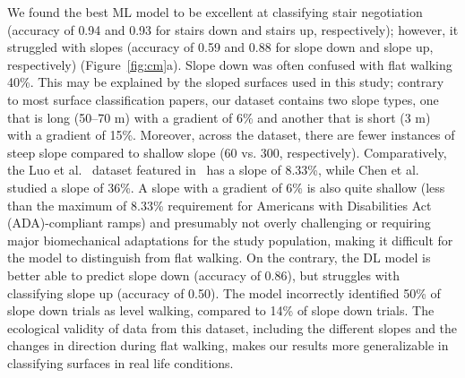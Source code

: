 \documentclass[sensors,article,accept,pdftex,moreauthors]{Definitions/mdpi}
\begin{document}
We found the best ML model to be excellent at classifying stair negotiation (accuracy of {0.94 and 0.93} for stairs down and stairs up, respectively); however, it struggled with slopes (accuracy of {0.59 and 0.88} for slope down and slope up, respectively) (Figure~\ref{fig:cm}a). Slope down {was} often confused with flat walking {40\%}. This may be explained by the sloped surfaces used in this study; contrary to most surface classification papers, our dataset contains two slope types, one that is long (\textcolor{revision}{50--70} m) with a gradient of 6\% and another that is short (3 m) with a gradient of 15\%. 
\textcolor{revision}{Moreover, across the dataset, there are fewer instances of steep slope compared to shallow slope (60 vs. 300, respectively).} Comparatively, the Luo et al.~\cite{Luo_2020} dataset featured in~\cite{Shah_2022, chauhan2025classifying, yildiz2023towards, Hu_2021} has a slope of 8.33\%, \textcolor{revision}{while Chen et al.~\cite{Chen2019} studied} a slope of 36\%. 
A slope with a gradient of 6\% is also quite shallow (less than the maximum of 8.33\% requirement for Americans with Disabilities Act (ADA)-compliant ramps) and presumably not overly challenging or requiring major biomechanical adaptations for the study population, \textcolor{revision}{making it difficult for the model to distinguish from flat walking.} On the contrary, the DL model is better able to predict slope {down} (accuracy of {0.86), but struggles with classifying slope up (accuracy of 0.50).}
The model incorrectly identified {50}\% of {slope down} trials as {level walking}, compared to {14}\% {of slope down trials}. 
The ecological validity of data from this dataset, including the different slopes and the changes in direction during flat walking, makes our results more generalizable in classifying surfaces in real life conditions. 
\end{document}
